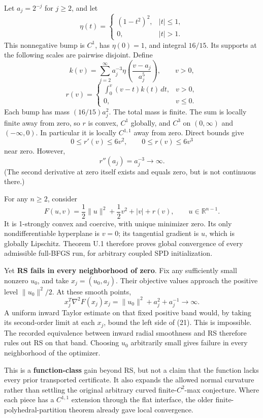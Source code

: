 Let \(a_j=2^{-j}\) for \(j\ge2\), and let \[
 \eta(t)=\begin{cases}(1-t^2)^2,&|t|\le1,\\0,&|t|>1.\end{cases}
\] This nonnegative bump is \(C^1\), has \(\eta(0)=1\), and integral
\(16/15\). Its supports at the following scales are pairwise disjoint.
Define \[
 k(v)=\sum_{j=2}^{\infty}a_j^{-3}
 \eta\!\left(\frac{v-a_j}{a_j^5}\right),\qquad v>0,
\] \[
 r(v)=\begin{cases}
 \displaystyle\int_0^v(v-t)k(t)\,dt,&v>0,\\
 0,&v\le0.
 \end{cases}\tag{U.18}
\] Each bump has mass \((16/15)a_j^2\). The total mass is finite. The
sum is locally finite away from zero, so \(r\) is convex, \(C^1\)
globally, and \(C^3\) on \((0,\infty)\) and \((-\infty,0)\). In
particular it is locally \(C^{1,1}\) away from zero. Direct bounds give
\[
 0\le r'(v)\le6v^2,\qquad 0\le r(v)\le6v^3
\] near zero. However, \[
 r''(a_j)=a_j^{-3}\to\infty.\tag{U.19}
\] (The second derivative at zero itself exists and equals zero, but is
not continuous there.)

For any \(n\ge2\), consider \[
 \boxed{
 F(u,v)=\frac12\|u\|^2+\frac12v^2+|v|+r(v),
 \qquad u\in\mathbb R^{n-1}.
 }\tag{U.20}
\] It is 1-strongly convex and coercive, with unique minimizer zero. Its
only nondifferentiable hyperplane is \(v=0\); its tangential gradient is
\(u\), which is globally Lipschitz. Theorem U.1 therefore proves global
convergence of every admissible full-BFGS run, for arbitrary coupled SPD
initialization.

Yet \textbf{RS fails in every neighborhood of zero}. Fix any
sufficiently small nonzero \(u_0\), and take \(x_j=(u_0,a_j)\). Their
objective values approach the positive level \(\|u_0\|^2/2\). At these
smooth points, \[
 x_j^T\nabla^2F(x_j)x_j
 =\|u_0\|^2+a_j^2+a_j^{-1}\longrightarrow\infty.\tag{U.21}
\] A uniform inward Taylor estimate on that fixed positive band would,
by taking its second-order limit at each \(x_j\), bound the left side of
(21). This is impossible. The recorded equivalence between inward radial
smoothness and RS therefore rules out RS on that band. Choosing \(u_0\)
arbitrarily small gives failure in every neighborhood of the optimizer.

This is a \textbf{function-class} gain beyond RS, but not a claim that
the function lacks every prior transported certificate. It also expands
the allowed normal curvature rather than settling the original arbitrary
curved finite-\(C^2\)-max conjecture. Where each piece has a \(C^{1,1}\)
extension through the flat interface, the older
finite-polyhedral-partition theorem already gave local convergence.

